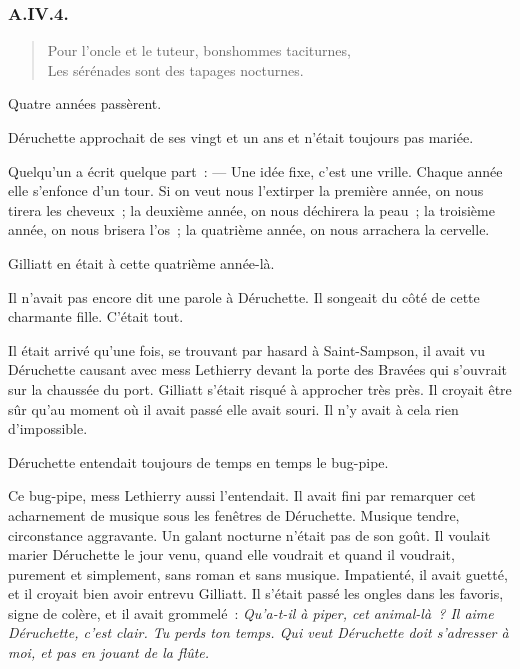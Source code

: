 \documentclass[french,twoside]{book} %
\newcommand{\bibl}[1]{{\RaggedLeft{#1}\par\bigskip}}
\begin{document}
 \subsubsection[{A.IV.4.}]{A.IV.4.}

\begin{verse}
Pour l’oncle et le tuteur, bonshommes taciturnes,\\
Les sérénades sont des tapages nocturnes.\\
\end{verse}

\bibl{(\emph{Vers d’une comédie inédite.})}
\noindent Quatre années passèrent.\par
Déruchette approchait de ses vingt et un ans et n’était toujours pas mariée.\par
Quelqu’un a écrit quelque part : — Une idée fixe, c’est une vrille. Chaque année elle s’enfonce d’un tour. Si on veut nous l’extirper la première année, on nous tirera les cheveux ; la deuxième année, on nous déchirera la peau ; la troisième année, on nous brisera l’os ; la quatrième année, on nous arrachera la cervelle.\par
Gilliatt en était à cette quatrième année-là.\par
Il n’avait pas encore dit une parole à Déruchette. Il songeait du côté de cette charmante fille. C’était tout.\par
Il était arrivé qu’une fois, se trouvant par hasard à Saint-Sampson, il avait vu Déruchette causant avec mess Lethierry devant la porte des Bravées qui s’ouvrait sur la chaussée du port. Gilliatt s’était risqué à  approcher très près. Il croyait être sûr qu’au moment où il avait passé elle avait souri. Il n’y avait à cela rien d’impossible.\par
Déruchette entendait toujours de temps en temps le bug-pipe.\par
Ce bug-pipe, mess Lethierry aussi l’entendait. Il avait fini par remarquer cet acharnement de musique sous les fenêtres de Déruchette. Musique tendre, circonstance aggravante. Un galant nocturne n’était pas de son goût. Il voulait marier Déruchette le jour venu, quand elle voudrait et quand il voudrait, purement et simplement, sans roman et sans musique. Impatienté, il avait guetté, et il croyait bien avoir entrevu Gilliatt. Il s’était passé les ongles dans les favoris, signe de colère, et il avait grommelé : \emph{Qu’a-t-il à piper, cet animal-là ? Il aime Déruchette, c’est clair. Tu perds ton temps. Qui veut Déruchette doit s’adresser à moi, et pas en jouant de la flûte.}\par
\end{document}
